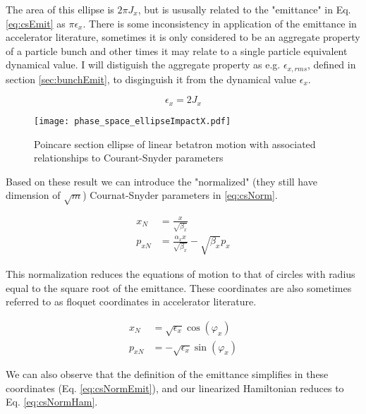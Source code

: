 The area of this ellipse is $2\pi J_x$, but is ususally related to the "emittance" in Eq. \ref{eq:csEmit} as $\pi \epsilon_x$. There is some inconsistency in application of the emittance in accelerator literature, sometimes it is only considered to be an aggregate property of a particle bunch and other times it may relate to a single particle equivalent dynamical value. I will distiguish the aggregate property as e.g. $\epsilon_{x,rms}$, defined in section \ref{sec:bunchEmit}, to disginguish it from the dynamical value $\epsilon_x$.

\begin{equation} \label{eq:csEmit}
	\epsilon_x = 2 J_x
\end{equation}

\begin{figure} \label{fig:csEllipse}
	\centering
	\texttt{[image: phase\_space\_ellipseImpactX.pdf]}
	\caption{Poincare section ellipse of linear betatron motion with associated relationships to Courant-Snyder parameters \cite{ImpactX}}
\end{figure}

Based on these result we can introduce the "normalized" (they still have dimension of $\sqrt{m}$) Cournat-Snyder parameters in \ref{eq:csNorm}.

\begin{equation} \label{eq:csNorm}
\begin{split}
	x_N &= \frac{x}{\sqrt{\beta_x}}\\
	p_{xN} &= \frac{\alpha_x x}{\sqrt{\beta_x}} - \sqrt{\beta_x}p_x
\end{split}
\end{equation}

This normalization reduces the equations of motion to that of circles with radius equal to the square root of the emittance. These coordinates are also sometimes referred to as floquet coordinates in accelerator literature.

\begin{equation} \label{eq:csNormVarphi}
\begin{split}
	x_N &= \sqrt{\epsilon_x} \cos{(\varphi_x)}\\
	p_{xN} &= -\sqrt{\epsilon_x} \sin{(\varphi_x)}
\end{split}
\end{equation}

We can also observe that the definition of the emittance simplifies in these coordinates (Eq. \ref{eq:csNormEmit}), and our linearized Hamiltonian reduces to Eq. \ref{eq:csNormHam}.

